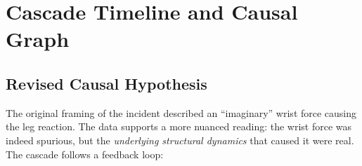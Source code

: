 \documentclass[11pt,a4paper]{article}
\begin{document}
\section{Cascade Timeline and Causal Graph}

\subsection{Revised Causal Hypothesis}

The original framing of the incident described an ``imaginary'' wrist
force causing the leg reaction.  The data supports a more nuanced reading:
the wrist force was indeed spurious, but the \emph{underlying structural
dynamics} that caused it were real.  The cascade follows a feedback loop:
\end{document}
